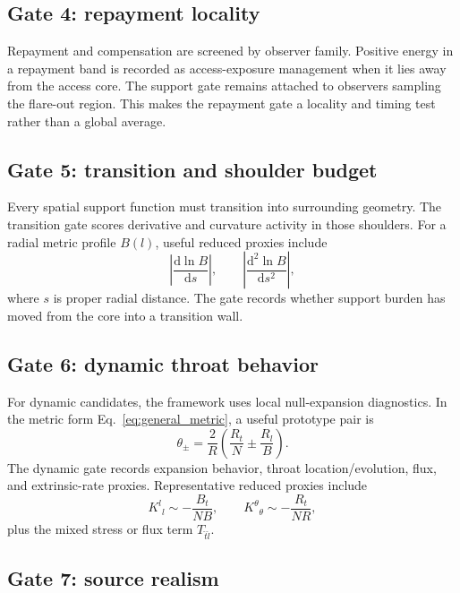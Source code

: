 \documentclass[11pt]{article}
\newcommand{\dd}{\mathrm{d}}
\begin{document}
\subsection{Gate 4: repayment locality}

Repayment and compensation are screened by observer family.  Positive energy in a repayment band is recorded as access-exposure management when it lies away from the access core.  The support gate remains attached to observers sampling the flare-out region.  This makes the repayment gate a locality and timing test rather than a global average.

\subsection{Gate 5: transition and shoulder budget}

Every spatial support function must transition into surrounding geometry.  The transition gate scores derivative and curvature activity in those shoulders.  For a radial metric profile $B(l)$, useful reduced proxies include
\begin{equation}
 \left|\frac{\dd \ln B}{\dd s}\right|,\qquad
 \left|\frac{\dd^2 \ln B}{\dd s^2}\right|,
\end{equation}
where $s$ is proper radial distance.  The gate records whether support burden has moved from the core into a transition wall.

\subsection{Gate 6: dynamic throat behavior}

For dynamic candidates, the framework uses local null-expansion diagnostics.  In the metric form Eq.~\eqref{eq:general_metric}, a useful prototype pair is
\begin{equation}
 \theta_\pm=\frac{2}{R}\left(\frac{R_t}{N}\pm\frac{R_l}{B}\right).
 \label{eq:expansions}
\end{equation}
The dynamic gate records expansion behavior, throat location/evolution, flux, and extrinsic-rate proxies.  Representative reduced proxies include
\begin{equation}
 K^l{}_l\sim -\frac{B_t}{NB},
 \qquad
 K^\theta{}_{\theta}\sim -\frac{R_t}{NR},
 \label{eq:extrinsic_proxies}
\end{equation}
plus the mixed stress or flux term $T_{\hat t\hat l}$.

\subsection{Gate 7: source realism}
\end{document}
